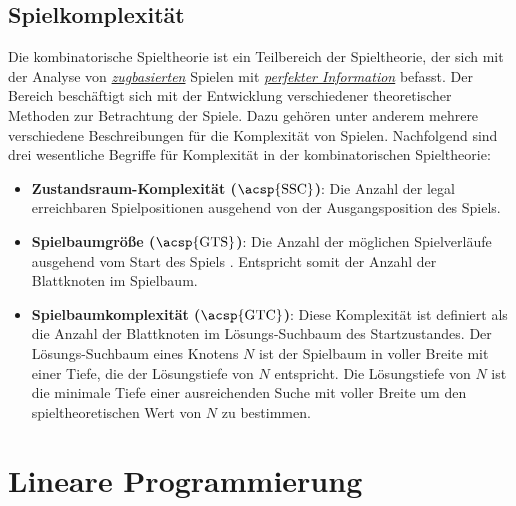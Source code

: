 \subsection{Spielkomplexität}

Die kombinatorische Spieltheorie ist ein Teilbereich der Spieltheorie, der sich mit der Analyse von \hyperref[text:game-theory-sequenziell]{\emph{zugbasierten}} Spielen mit \hyperref[text:game-theory-perfekte-information]{\emph{perfekter Information}} befasst. Der Bereich beschäftigt sich mit der Entwicklung verschiedener theoretischer Methoden zur Betrachtung der Spiele. Dazu gehören unter anderem mehrere verschiedene Beschreibungen für die Komplexität von Spielen. Nachfolgend sind drei wesentliche Begriffe für Komplexität in der kombinatorischen Spieltheorie:

\pagebreak

\begin{itemize}
    \item \textbf{Zustandsraum-Komplexität ($\text{\acsp{SSC}}$)}: Die Anzahl der legal erreichbaren Spielpositionen ausgehend von der Ausgangsposition des Spiels. \cite[S. 106]{2007.SolvingGames}
    \item \vspace*{-0.2cm} \textbf{Spielbaumgröße ($\text{\acsp{GTS}}$)}: Die Anzahl der möglichen Spielverläufe ausgehend vom Start des Spiels \cite[S. 1]{2019.GameTreeComplexityEstimation}. Entspricht somit der Anzahl der Blattknoten im Spielbaum.
    \item \vspace*{-0.2cm} \textbf{Spielbaumkomplexität ($\text{\acsp{GTC}}$)}: Diese Komplexität ist definiert als die Anzahl der Blattknoten im Lösungs-Suchbaum des Startzustandes. Der Lösungs-Suchbaum eines Knotens $N$ ist der Spielbaum in voller Breite mit einer Tiefe, die der Lösungstiefe von $N$ entspricht. Die Lösungstiefe von $N$ ist die minimale Tiefe einer ausreichenden Suche mit voller Breite um den spieltheoretischen Wert von $N$ zu bestimmen. \cite[S. 299]{2002.GamesSolved}
\end{itemize}

\vspace*{-0.2cm}
\vspace*{-0.15cm}

\section{Lineare Programmierung}
\label{chapter:lineare-programmierung}

